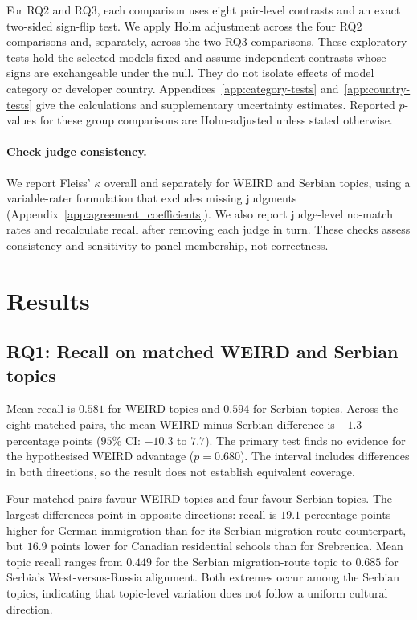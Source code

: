 \documentclass[11pt,a4paper]{article}
\begin{document}
For RQ2 and RQ3, each comparison uses eight pair-level contrasts and an exact two-sided sign-flip test. We apply Holm adjustment across the four RQ2 comparisons and, separately, across the two RQ3 comparisons. These exploratory tests hold the selected models fixed and assume independent contrasts whose signs are exchangeable under the null. They do not isolate effects of model category or developer country. Appendices~\ref{app:category-tests} and~\ref{app:country-tests} give the calculations and supplementary uncertainty estimates. Reported $p$-values for these group comparisons are Holm-adjusted unless stated otherwise.

\paragraph{Check judge consistency.}
We report Fleiss' $\kappa$ overall and separately for WEIRD and Serbian topics, using a variable-rater formulation that excludes missing judgments (Appendix~\ref{app:agreement_coefficients}). We also report judge-level no-match rates and recalculate recall after removing each judge in turn. These checks assess consistency and sensitivity to panel membership, not correctness.

\section{Results}
\subsection{RQ1: Recall on matched WEIRD and Serbian topics}
\label{sec:rq1}
Mean recall is $0.581$ for WEIRD topics and $0.594$ for Serbian topics. Across the eight matched pairs, the mean WEIRD-minus-Serbian difference is $-1.3$ percentage points ($95\%$ CI: $-10.3$ to $7.7$). The primary test finds no evidence for the hypothesised WEIRD advantage ($p=0.680$). The interval includes differences in both directions, so the result does not establish equivalent coverage.

Four matched pairs favour WEIRD topics and four favour Serbian topics. The largest differences point in opposite directions: recall is $19.1$ percentage points higher for German immigration than for its Serbian migration-route counterpart, but $16.9$ points lower for Canadian residential schools than for Srebrenica. Mean topic recall ranges from $0.449$ for the Serbian migration-route topic to $0.685$ for Serbia's West-versus-Russia alignment. Both extremes occur among the Serbian topics, indicating that topic-level variation does not follow a uniform cultural direction.
\end{document}
